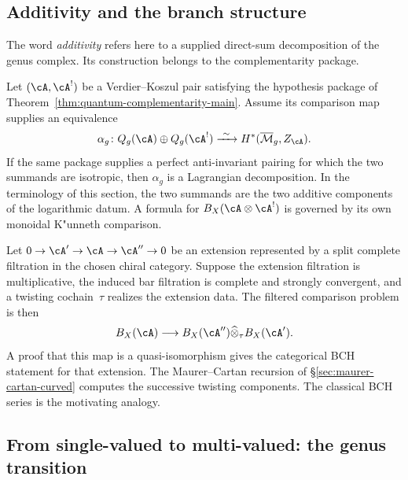 \subsection{Additivity and the branch structure}
\label{subsec:additivity-branch}

The word \emph{additivity} refers here to a supplied direct-sum
decomposition of the genus complex.  Its construction belongs to the
complementarity package.

\begin{proposition}
\label{prop:log-additivity}
Let $(\cA,\cA^!)$ be a Verdier--Koszul pair satisfying the hypothesis
package of Theorem~\ref{thm:quantum-complementarity-main}.  Assume its
comparison map supplies an equivalence
\[
 \alpha_g\colon Q_g(\cA)\oplus Q_g(\cA^!)
 \xrightarrow{\ \sim\ }
 H^*(\overline{\mathcal{M}}_g,Z_\cA).
\]
If the same package supplies a perfect anti-invariant pairing for
which the two summands are isotropic, then $\alpha_g$ is a Lagrangian
decomposition.  In the terminology of this section, the two summands
are the two additive components of the logarithmic datum.  A formula
for $B_X(\cA\otimes\cA^!)$ is governed by its own monoidal K"unneth
comparison.
\end{proposition}

\begin{remark}
\label{rem:categorical-bch}
Let
$0\to\cA'\to\cA\to\cA''\to0$ be an extension represented by a split
complete filtration in the chosen chiral category.  Suppose the
extension filtration is multiplicative, the induced bar filtration is
complete and strongly convergent, and a twisting cochain~$\tau$
realizes the extension data.  The filtered comparison problem is then
\[
 B_X(\cA)\longrightarrow
 B_X(\cA'')\widehat\otimes_\tau B_X(\cA').
\]
A proof that this map is a quasi-isomorphism gives the categorical
BCH statement for that extension.  The Maurer--Cartan recursion of
\S\ref{sec:maurer-cartan-curved} computes the successive twisting
components.  The classical BCH series is the motivating analogy.
\end{remark}

\subsection{From single-valued to multi-valued: the genus transition}
\label{subsec:genus-transition-log}

